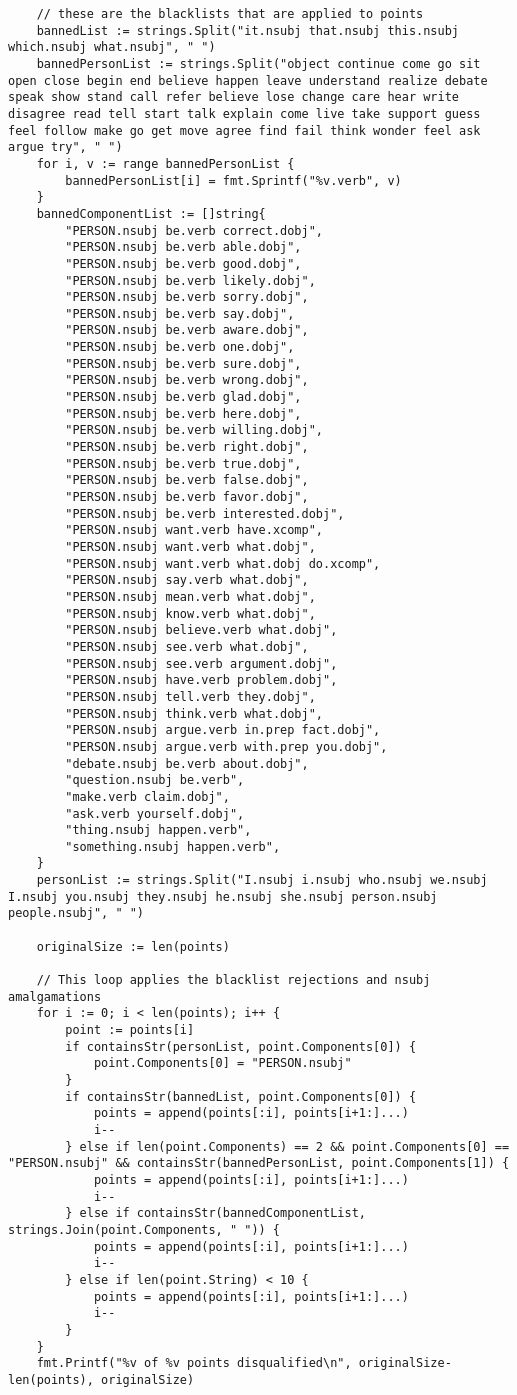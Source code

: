 \documentclass{article}
\begin{document}
\begin{verbatim}
	// these are the blacklists that are applied to points
	bannedList := strings.Split("it.nsubj that.nsubj this.nsubj which.nsubj what.nsubj", " ")
	bannedPersonList := strings.Split("object continue come go sit open close begin end believe happen leave understand realize debate speak show stand call refer believe lose change care hear write disagree read tell start talk explain come live take support guess feel follow make go get move agree find fail think wonder feel ask argue try", " ")
	for i, v := range bannedPersonList {
		bannedPersonList[i] = fmt.Sprintf("%v.verb", v)
	}
	bannedComponentList := []string{
		"PERSON.nsubj be.verb correct.dobj",
		"PERSON.nsubj be.verb able.dobj",
		"PERSON.nsubj be.verb good.dobj",
		"PERSON.nsubj be.verb likely.dobj",
		"PERSON.nsubj be.verb sorry.dobj",
		"PERSON.nsubj be.verb say.dobj",
		"PERSON.nsubj be.verb aware.dobj",
		"PERSON.nsubj be.verb one.dobj",
		"PERSON.nsubj be.verb sure.dobj",
		"PERSON.nsubj be.verb wrong.dobj",
		"PERSON.nsubj be.verb glad.dobj",
		"PERSON.nsubj be.verb here.dobj",
		"PERSON.nsubj be.verb willing.dobj",
		"PERSON.nsubj be.verb right.dobj",
		"PERSON.nsubj be.verb true.dobj",
		"PERSON.nsubj be.verb false.dobj",
		"PERSON.nsubj be.verb favor.dobj",
		"PERSON.nsubj be.verb interested.dobj",
		"PERSON.nsubj want.verb have.xcomp",
		"PERSON.nsubj want.verb what.dobj",
		"PERSON.nsubj want.verb what.dobj do.xcomp",
		"PERSON.nsubj say.verb what.dobj",
		"PERSON.nsubj mean.verb what.dobj",
		"PERSON.nsubj know.verb what.dobj",
		"PERSON.nsubj believe.verb what.dobj",
		"PERSON.nsubj see.verb what.dobj",
		"PERSON.nsubj see.verb argument.dobj",
		"PERSON.nsubj have.verb problem.dobj",
		"PERSON.nsubj tell.verb they.dobj",
		"PERSON.nsubj think.verb what.dobj",
		"PERSON.nsubj argue.verb in.prep fact.dobj",
		"PERSON.nsubj argue.verb with.prep you.dobj",
		"debate.nsubj be.verb about.dobj",
		"question.nsubj be.verb",
		"make.verb claim.dobj",
		"ask.verb yourself.dobj",
		"thing.nsubj happen.verb",
		"something.nsubj happen.verb",
	}
	personList := strings.Split("I.nsubj i.nsubj who.nsubj we.nsubj I.nsubj you.nsubj they.nsubj he.nsubj she.nsubj person.nsubj people.nsubj", " ")

	originalSize := len(points)

	// This loop applies the blacklist rejections and nsubj amalgamations
	for i := 0; i < len(points); i++ {
		point := points[i]
		if containsStr(personList, point.Components[0]) {
			point.Components[0] = "PERSON.nsubj"
		}
		if containsStr(bannedList, point.Components[0]) {
			points = append(points[:i], points[i+1:]...)
			i--
		} else if len(point.Components) == 2 && point.Components[0] == "PERSON.nsubj" && containsStr(bannedPersonList, point.Components[1]) {
			points = append(points[:i], points[i+1:]...)
			i--
		} else if containsStr(bannedComponentList, strings.Join(point.Components, " ")) {
			points = append(points[:i], points[i+1:]...)
			i--
		} else if len(point.String) < 10 {
			points = append(points[:i], points[i+1:]...)
			i--
		}
	}
	fmt.Printf("%v of %v points disqualified\n", originalSize-len(points), originalSize)


\end{verbatim}
\end{document}
